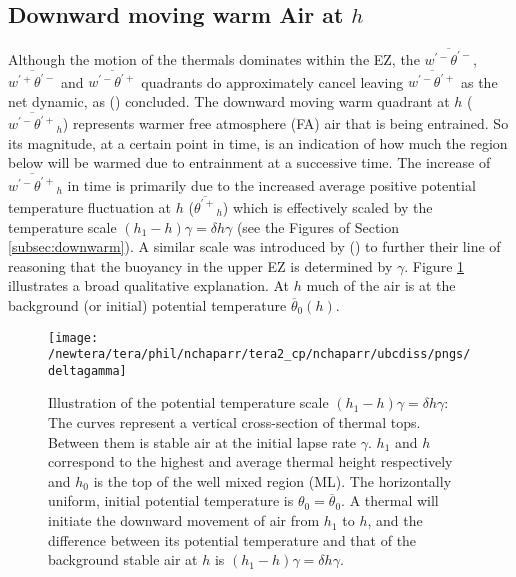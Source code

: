 \subsection{Downward moving warm Air at $h$}

 Although the motion of the thermals dominates within the \acs{EZ}, the $\overline{w^{'-}\theta^{'-}}$, $\overline{w^{'+}\theta^{'-}}$ and $\overline{w^{'-}\theta^{'+}}$ quadrants do approximately cancel leaving $\overline{w^{'-}\theta^{'+}}$ as the net dynamic, as \citeauthor{SullMoengStev} (\citeyear{SullMoengStev}) concluded. The downward moving warm quadrant at $h$ ($\overline{w^{'-}\theta^{'+}}_{h}$) represents warmer free atmosphere (\acs{FA}) air that is being entrained.  So its magnitude, at a certain point in time, is an indication of how much the region below will be warmed due to entrainment at a successive time.  The increase of $\overline{w^{'-}\theta^{'+}}_{h}$ in time is primarily due to the increased average positive potential temperature fluctuation at $h$ ($\overline{\theta^{'+}}_{h}$) which is effectively scaled by the temperature scale $(h_{1}-h)\gamma = \delta h \gamma$ (see the Figures of Section \ref{subsec:downwarm}).  A similar scale was introduced by \citeauthor{GarciaMellado} (\citeyear{GarciaMellado}) to further their line of reasoning that the buoyancy in the upper \acs{EZ} is determined by $\gamma$. Figure \ref{fig:deltagamma} illustrates a broad qualitative explanation.  At $h$ much of the air is at the background (or initial) potential temperature $\overline{\theta}_{0}(h)$. 

\begin{figure}[htbp]
    \centering
    \texttt{[image: /newtera/tera/phil/nchaparr/tera2\_cp/nchaparr/ubcdiss/pngs/deltagamma]}
    \caption[Illustration of \acs{EZ} Potential Temperature Scale based on $\gamma$]{Illustration of the potential temperature scale $(h_{1}-h)\gamma = \delta h \gamma$: The curves represent a vertical cross-section of thermal tops.  Between them is stable air at the initial lapse rate $\gamma$. $h_{1}$ and $h$ correspond to the highest and average thermal height respectively and $h_{0}$ is the top of the well mixed region (\acs{ML}).  The horizontally uniform, initial potential temperature is $\theta_{0} = \overline{\theta}_{0}$. A thermal will initiate the downward movement of air from $h_{1}$ to $h$, and the difference between its potential temperature and that of the background stable air at $h$ is $(h_{1}-h)\gamma = \delta h \gamma$.}
    \label{fig:deltagamma}   %
\end{figure}

